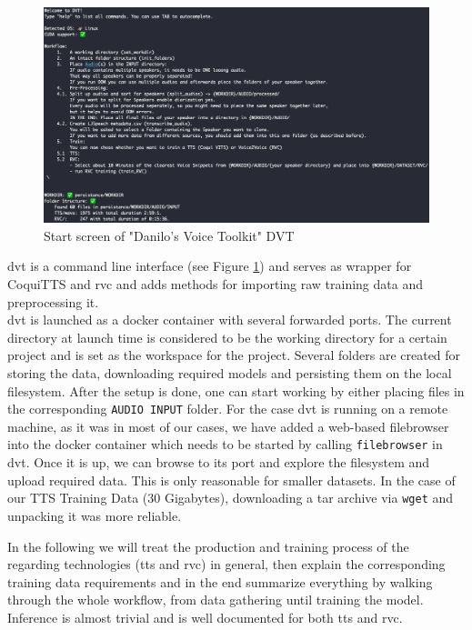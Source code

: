 \documentclass[
  a4paper,  %
  twoside,  %
  bibliography=totoc,
  headsepline,
  cleardoublepage=empty,
  parskip=half,
  draft=false
]{scrbook}
\begin{document}
\begin{figure}[h]
  \centering
  \includegraphics[width=1\textwidth]{./graphics/images/dvt-screen.png}
  \caption{Start screen of "Danilo's Voice Toolkit" DVT}
  \label{fig:dvt-interface}
\end{figure}

\gls{dvt} is a command line interface (see Figure \ref{fig:dvt-interface}) and serves as wrapper for CoquiTTS and \gls{rvc} and adds methods for importing raw training data and preprocessing it. \\
\gls{dvt} is launched as a docker container with several forwarded ports. The current directory at launch time is considered to be the working directory for a certain project and is set as the workspace for the project. Several folders are created for storing the data, downloading required models and persisting them on the local filesystem. After the setup is done, one can start working by either placing files in the corresponding \verb|AUDIO INPUT| folder. For the case \gls{dvt} is running on a remote machine, as it was in most of our cases, we have added a web-based filebrowser into the docker container which needs to be started by calling \verb|filebrowser| in \gls{dvt}. Once it is up, we can browse to its port and explore the filesystem and upload required data. This is only reasonable for smaller datasets. In the case of our TTS Training Data (30 Gigabytes), downloading a tar archive via \verb|wget| and unpacking it was more reliable. 

In the following we will treat the production and training process of the regarding technologies (\gls{tts} and \gls{rvc}) in general, then explain the corresponding training data requirements and in the end summarize everything by walking through the whole workflow, from data gathering until training the model. Inference is almost trivial and is well documented for both \gls{tts} and \gls{rvc}.
\end{document}
